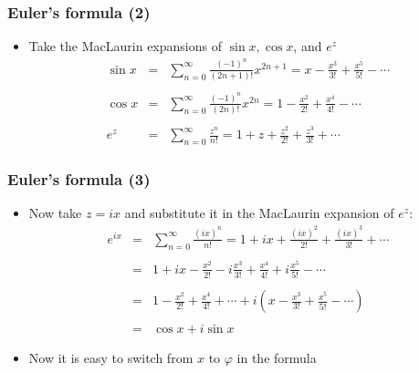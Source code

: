 \documentclass[10pt]{beamer}
\theoremstyle{definition}
\begin{document}
\begin{frame}[fragile]
	\frametitle{Euler's formula (2)}
	\begin{itemize}
		\item Take the MacLaurin expansions of $\sin x, \cos x$, and $e^z$
		\[
		\begin{array}{lcl}
			\sin x & = & \displaystyle \sum_{n=0}^{\infty}\frac{(-1)^n}{(2n+1)!}x^{2n+1}=x-\frac{x^3}{3!}+\frac{x^5}{5!}-\cdots\\
			\quad\\
			\cos x & = & \displaystyle \sum_{n=0}^{\infty}\frac{(-1)^n}{(2n)!}x^{2n}=1-\frac{x^2}{2!}+\frac{x^4}{4!}-\cdots\\
			\quad\\
			e^z & = & \displaystyle \sum_{n=0}^{\infty}\frac{z^n}{n!}=1+z+\frac{z^2}{2!}+\frac{z^3}{3!}+\cdots		
		\end{array}
		\]
	\end{itemize}
\end{frame}

\begin{frame}[fragile]
	\frametitle{Euler's formula (3)}
	\begin{itemize}
		\item Now take $z = ix$ and substitute it in the MacLaurin expansion of $e^{z}$:
		\[
		\begin{array}{lcl}
			e^{ix}& = & \displaystyle \sum_{n=0}^{\infty}\frac{(ix)^n}{n!}=1 + ix +\frac{(ix)^2}{2!}+\frac{(ix)^3}{3!}+\cdots\\
			\quad\\
			& = & \displaystyle 1+ix-\frac{x^2}{2!}-i\frac{x^3}{3!}+\frac{x^4}{4!}+i\frac{x^5}{5!}-\cdots\\
			\quad\\
			& = & \displaystyle 1-\frac{x^2}{2!}+\frac{x^4}{4!}+\cdots +i\left(x-\frac{x^3}{3!}+\frac{x^5}{5!}-\cdots\right)\\
			\quad\\
			& = & \cos x+i\sin x
		\end{array}
		\]
		\item Now it is easy to switch from $x$ to $\varphi$ in the formula
	\end{itemize}
\end{frame}
\end{document}
